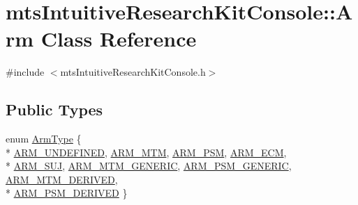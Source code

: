 \hypertarget{classmts_intuitive_research_kit_console_1_1_arm}{\section{mts\-Intuitive\-Research\-Kit\-Console\-:\-:Arm Class Reference}
\label{classmts_intuitive_research_kit_console_1_1_arm}
}


{\ttfamily \#include $<$mts\-Intuitive\-Research\-Kit\-Console.\-h$>$}

\subsection*{Public Types}
\begin{DoxyCompactItemize}
\item 
enum \hyperlink{classmts_intuitive_research_kit_console_1_1_arm_acb898ba65d323f59ffd0885a47ef6cec}{Arm\-Type} \{ \\*
\hyperlink{classmts_intuitive_research_kit_console_1_1_arm_acb898ba65d323f59ffd0885a47ef6cecae024f3f6b8d2ee977f7fd0a4e189fd14}{A\-R\-M\-\_\-\-U\-N\-D\-E\-F\-I\-N\-E\-D}, 
\hyperlink{classmts_intuitive_research_kit_console_1_1_arm_acb898ba65d323f59ffd0885a47ef6ceca925a57962bd2e8f0d5c69149ede508c8}{A\-R\-M\-\_\-\-M\-T\-M}, 
\hyperlink{classmts_intuitive_research_kit_console_1_1_arm_acb898ba65d323f59ffd0885a47ef6ceca209dc5ec65dd5a23a2792dea8d951daf}{A\-R\-M\-\_\-\-P\-S\-M}, 
\hyperlink{classmts_intuitive_research_kit_console_1_1_arm_acb898ba65d323f59ffd0885a47ef6cecaf2778d3b94620ba8ca327ad7c04babd3}{A\-R\-M\-\_\-\-E\-C\-M}, 
\\*
\hyperlink{classmts_intuitive_research_kit_console_1_1_arm_acb898ba65d323f59ffd0885a47ef6ceca775845df3507bbd7efb2d09a50b7c049}{A\-R\-M\-\_\-\-S\-U\-J}, 
\hyperlink{classmts_intuitive_research_kit_console_1_1_arm_acb898ba65d323f59ffd0885a47ef6ceca347ea283eaaab7b50bc26dd41bb59078}{A\-R\-M\-\_\-\-M\-T\-M\-\_\-\-G\-E\-N\-E\-R\-I\-C}, 
\hyperlink{classmts_intuitive_research_kit_console_1_1_arm_acb898ba65d323f59ffd0885a47ef6ceca1e6bca671de0e7b8ddb7938f31d5d834}{A\-R\-M\-\_\-\-P\-S\-M\-\_\-\-G\-E\-N\-E\-R\-I\-C}, 
\hyperlink{classmts_intuitive_research_kit_console_1_1_arm_acb898ba65d323f59ffd0885a47ef6cecaceab587f92c5fefec2f4a1b1febd1ce8}{A\-R\-M\-\_\-\-M\-T\-M\-\_\-\-D\-E\-R\-I\-V\-E\-D}, 
\\*
\hyperlink{classmts_intuitive_research_kit_console_1_1_arm_acb898ba65d323f59ffd0885a47ef6cecaac216561ab7a5ad8f4f460c9d5511e65}{A\-R\-M\-\_\-\-P\-S\-M\-\_\-\-D\-E\-R\-I\-V\-E\-D}
 \}
\end{DoxyCompactItemize}
